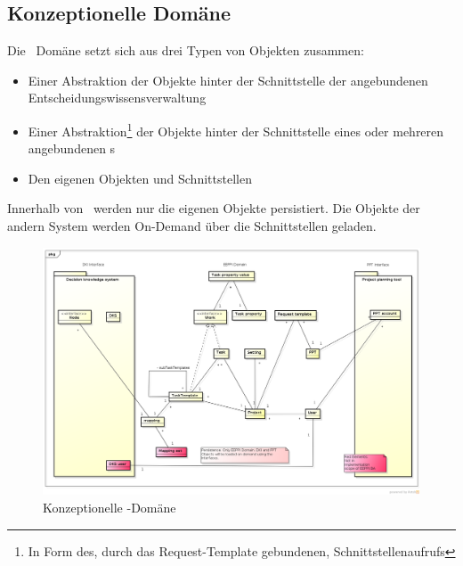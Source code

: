	
		\subsection{Konzeptionelle Domäne}
			Die \eeppi\ Domäne setzt sich aus drei Typen von Objekten zusammen: 
			\begin{itemize}
				\item Einer Abstraktion der Objekte hinter der Schnittstelle der angebundenen Entscheidungswissensverwaltung
				\item Einer Abstraktion\footnote{In Form des, durch das Request-Template gebundenen, Schnittstellenaufrufs} der Objekte hinter der Schnittstelle eines oder mehreren angebundenen \ppt s
				\item Den eigenen Objekten und Schnittstellen
			\end{itemize}
			
			Innerhalb von \eeppi\ werden nur die eigenen Objekte persistiert.
			Die Objekte der andern System werden On-Demand über die Schnittstellen geladen.
		
			\begin{landscape}
				\begin{figure}[H]
					\includegraphics[width=\linewidth]{architecture/media/img/domain.png}
					\centering
					\caption{Konzeptionelle \eeppi -Domäne}
					\label{fig:domain}
				\end{figure}				
			\end{landscape}
			
